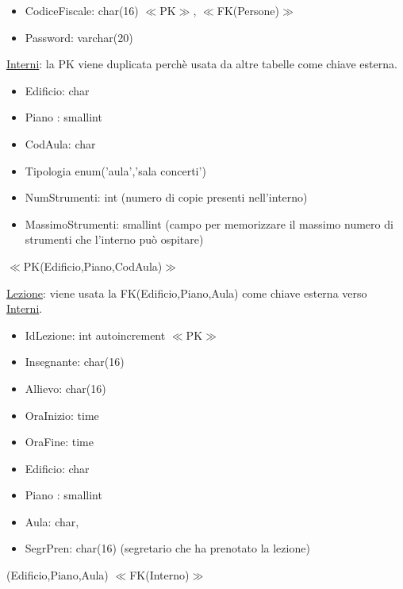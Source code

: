 \documentclass{article}
\begin{document}
\begin{itemize}
\item CodiceFiscale: char(16) $\ll$PK$\gg$, $\ll$FK(Persone)$\gg$
\item Password: varchar(20)
\end{itemize}

\medskip

\begin{flushleft}
\underline{Interni}: la PK viene duplicata perchè usata da altre tabelle come chiave esterna.
\end{flushleft}

\begin{itemize}
\item Edificio: char
\item Piano	: smallint
\item CodAula: char
\item Tipologia enum('aula','sala concerti')
\item NumStrumenti: int  (numero di copie presenti nell'interno)
\item MassimoStrumenti: smallint  (campo per memorizzare il massimo numero di strumenti che l'interno può ospitare)
\end{itemize}

$\ll$PK(Edificio,Piano,CodAula)$\gg$

\newpage

\begin{flushleft}
\underline{Lezione}: viene usata la FK(Edificio,Piano,Aula) come chiave esterna verso \underline{Interni}.
\end{flushleft}

\begin{itemize}
\item IdLezione:  int auto\textunderscore increment $\ll$PK$\gg$
\item Insegnante: char(16)
\item Allievo:   char(16)
\item OraInizio:  time     
\item OraFine:    time 	
\item Edificio:   char
\item Piano	:  	 smallint
\item Aula:       char,
\item SegrPren:  char(16) (segretario che ha prenotato la lezione)
\end{itemize}

(Edificio,Piano,Aula) $\ll$FK(Interno)$\gg$
\end{document}
